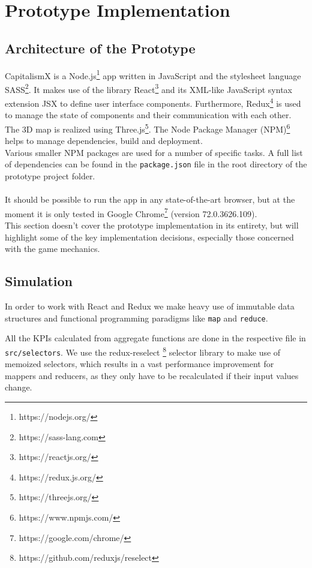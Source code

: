 \section{Prototype Implementation}
\subsection{Architecture of the Prototype}

CapitalismX is a Node.js\footnote{https://nodejs.org/} app written in JavaScript and the stylesheet language SASS\footnote{https://sass-lang.com}. It makes use of the library React\footnote{https://reactjs.org/} and its XML-like JavaScript syntax extension JSX to define user interface components. Furthermore, Redux\footnote{https://redux.js.org/} is used to manage the state of components and their communication with each other. The 3D map is realized using Three.js\footnote{https://threejs.org/}. The Node Package Manager (NPM)\footnote{https://www.npmjs.com/} helps to manage dependencies, build and deployment.
\\
Various smaller NPM packages are used for a number of specific tasks. A full list of dependencies can be found in the \texttt{package.json} file in the root directory of the prototype project folder.\\\\
It should be possible to run the app in any state-of-the-art browser, but at the moment it is only tested in Google Chrome\footnote{https://google.com/chrome/} (version 72.0.3626.109).
\\
This section doesn't cover the prototype implementation in its entirety, but will highlight some of the key implementation decisions, especially those concerned with the game mechanics.

\subsection{Simulation}

In order to work with React and Redux we make heavy use of immutable data structures and functional programming paradigms like \texttt{map} and \texttt{reduce}.

All the KPIs calculated from aggregate functions are done in the respective file in \texttt{src/selectors}. We use the redux-reselect \footnote{https://github.com/reduxjs/reselect} selector library to make use of memoized selectors, which results in a vast performance improvement for mappers and reducers, as they only have to be recalculated if their input values change.

